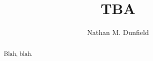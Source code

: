 \documentclass[noaddress, tikz]{nmd/article}
\title{TBA}
\author{Nathan M. Dunfield}
\begin{document}
\begin{abstract} 
  Blah, blah.  
\end{abstract}
\maketitle


{\RaggedRight 
 

}
\end{document}
